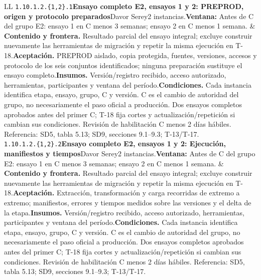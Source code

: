 \begin{longtable}{L{\tabcolsep\relax}L{\tabcolsep\relax}}
\texttt{1.\allowbreak{}10.\allowbreak{}1.\allowbreak{}2.\allowbreak{}\{1,\allowbreak{}2\}.\allowbreak{}1}\newline{}\textbf{Ensayo completo E2, ensayos 1 y 2: PREPROD, origen y protocolo preparados}\newline{}Davor Serey\newline{}2 instancias.\newline{}\textbf{Ventana:} Antes de C del grupo E2: ensayo 1 en C menos 3 semanas; ensayo 2 en C menos 1 semana. & \textbf{Contenido y frontera.} Resultado parcial del ensayo integral; excluye construir nuevamente las herramientas de migración y repetir la misma ejecución en T-18.\newline{}\textbf{Aceptación.} PREPROD aislado, copia protegida, fuentes, versiones, accesos y protocolo de los seis conjuntos identificados; ninguna preparación sustituye el ensayo completo.\newline{}\textbf{Insumos.} Versión/registro recibido, acceso autorizado, herramientas, participantes y ventana del período.\newline{}\textbf{Condiciones.} Cada instancia identifica etapa, ensayo, grupo, C y versión. C es el cambio de autoridad del grupo, no necesariamente el paso oficial a producción. Dos ensayos completos aprobados antes del primer C; T-18 fija cortes y actualización/repetición si cambian sus condiciones. Revisión de habilitación C menos 2 días hábiles. Referencia: SD5, tabla 5.13; SD9, secciones 9.1--9.3; T-13/T-17.\\\hline
\texttt{1.\allowbreak{}10.\allowbreak{}1.\allowbreak{}2.\allowbreak{}\{1,\allowbreak{}2\}.\allowbreak{}2}\newline{}\textbf{Ensayo completo E2, ensayos 1 y 2: Ejecución, manifiestos y tiempos}\newline{}Davor Serey\newline{}2 instancias.\newline{}\textbf{Ventana:} Antes de C del grupo E2: ensayo 1 en C menos 3 semanas; ensayo 2 en C menos 1 semana. & \textbf{Contenido y frontera.} Resultado parcial del ensayo integral; excluye construir nuevamente las herramientas de migración y repetir la misma ejecución en T-18.\newline{}\textbf{Aceptación.} Extracción, transformación y carga recorridas de extremo a extremo; manifiestos, errores y tiempos medidos sobre las versiones y el delta de la etapa.\newline{}\textbf{Insumos.} Versión/registro recibido, acceso autorizado, herramientas, participantes y ventana del período.\newline{}\textbf{Condiciones.} Cada instancia identifica etapa, ensayo, grupo, C y versión. C es el cambio de autoridad del grupo, no necesariamente el paso oficial a producción. Dos ensayos completos aprobados antes del primer C; T-18 fija cortes y actualización/repetición si cambian sus condiciones. Revisión de habilitación C menos 2 días hábiles. Referencia: SD5, tabla 5.13; SD9, secciones 9.1--9.3; T-13/T-17.\\\hline

\end{longtable}
